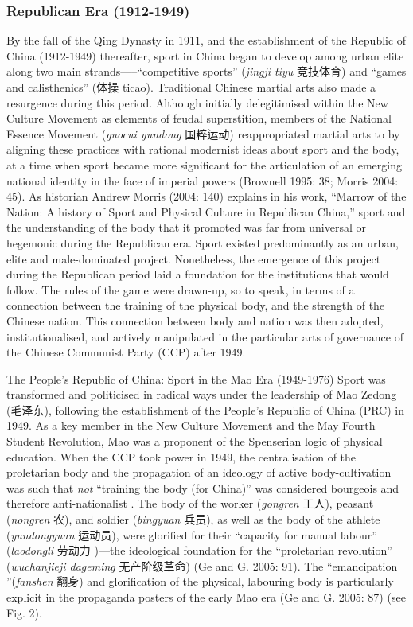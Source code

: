 \subsubsection{Republican Era (1912-1949)}
By the fall of the Qing Dynasty in 1911, and the establishment of the Republic of China (1912-1949) thereafter, sport in China began to develop among urban elite along two main strands—--``competitive sports'' (\textit{jingji tiyu} 竞技体育) and ``games and calisthenics'' (体操 ticao).  Traditional Chinese martial arts also made a resurgence during this period.  Although initially delegitimised within the New Culture Movement as elements of feudal superstition, members of the National Essence Movement (\textit{guocui yundong} 国粹运动) reappropriated martial arts to by aligning these practices with rational modernist ideas about sport and the body, at a time when sport became more significant for the articulation of an emerging national identity in the face of imperial powers (Brownell 1995: 38; Morris 2004: 45).  As historian Andrew Morris (2004: 140) explains in his work, ``Marrow of the Nation: A history of Sport and Physical Culture in Republican China,''  sport and the understanding of the body that it promoted was far from universal or hegemonic during the Republican era.  Sport existed predominantly as an urban, elite and male-dominated project.  Nonetheless, the emergence of this project during the Republican period laid a foundation for the institutions that would follow.  The rules of the game were drawn-up, so to speak, in terms of a connection between the training of the physical body, and the strength of the Chinese nation.  This connection between body and nation was then adopted, institutionalised, and actively manipulated in the particular arts of governance of the Chinese Communist Party (CCP) after 1949.


The People's Republic of China: Sport in the Mao Era (1949-1976)
Sport was transformed and politicised in radical ways under the leadership of Mao Zedong (毛泽东), following the establishment of the People’s Republic of China (PRC) in 1949.  As a key member in the New Culture Movement and the May Fourth Student Revolution, Mao was a proponent of the Spenserian logic of physical education.   When the CCP took power in 1949, the centralisation of the proletarian body and the propagation of an ideology of active body-cultivation was such that \textit{not} ``training the body (for China)'' was considered bourgeois and therefore anti-nationalist \citep[58]{Brownell1995}.  The body of the worker (\textit{gongren} 工人), peasant (\textit{nongren} 农), and soldier (\textit{bingyuan} 兵员), as well as the body of the athlete (\textit{yundongyuan} 运动员), were glorified for their ``capacity for manual labour'' (\textit{laodongli} 劳动力 )---the ideological foundation for the ``proletarian revolution'' (\textit{wuchanjieji dageming} 无产阶级革命) (Ge and G. 2005: 91).  The ``emancipation ''(\textit{fanshen} 翻身) and glorification of the physical, labouring body is particularly explicit in the propaganda posters of the early Mao era (Ge and G. 2005: 87) (see Fig. 2).


